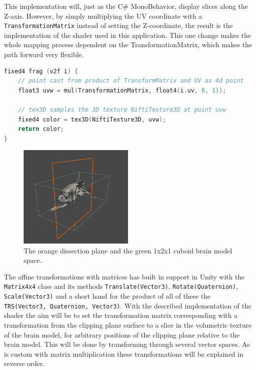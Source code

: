 This implementation will, just as the C\# MonoBehavior, display slices along the Z-axis. However, by simply multiplying the UV coordinate with a \texttt{TransformationMatrix} instead of setting the Z-coordinate, the result is the implementation of the shader used in this application. This one change makes the whole mapping process dependent on the TransformationMatrix, which makes the path forward very flexible.

\begin{lstlisting}[language=c]
fixed4 frag (v2f i) {
    // point cast from product of TransformMatrix and UV as 4d point
    float3 uvw = mul(TransformationMatrix, float4(i.uv, 0, 1));

    // tex3D samples the 3D texture NiftiTexture3D at point uvw
    fixed4 color = tex3D(NiftiTexture3D, uvw);
    return color;
}
\end{lstlisting}
\begin{figure}[ht]
    \centering
    \includegraphics[width=0.5\textwidth]{fig/dissection_boxplaneview.png}
    \caption{The orange dissection plane and the green 1x2x1 cuboid brain model space.}
    \label{fig:boxandplanedissect}
\end{figure}

The affine transformations with matrices has built in support in Unity with the \texttt{Matrix4x4} class and its methods \texttt{Translate(Vector3)}, \texttt{Rotate(Quaternion)}, \texttt{Scale(Vector3)} and a short hand for the product of all of these the \texttt{TRS(Vector3, Quaternion, Vector3)}. 
With the described implementation of the shader the aim will be to set the transformation matrix corresponding with a transformation from the clipping plane surface to a slice in the volumetric texture of the brain model, for arbitrary positions of the clipping plane relative to the brain model. This will be done by transforming through several vector spaces. As is custom with matrix multiplication these transformations will be explained in reverse order. 

